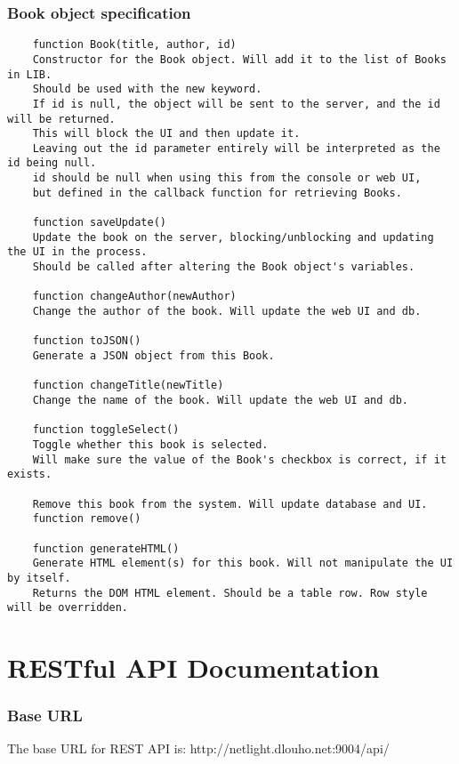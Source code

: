 \subsubsection{Book object specification}
\begin{verbatim}
    function Book(title, author, id)
    Constructor for the Book object. Will add it to the list of Books in LIB.
    Should be used with the new keyword.
    If id is null, the object will be sent to the server, and the id will be returned.
    This will block the UI and then update it.
    Leaving out the id parameter entirely will be interpreted as the id being null.
    id should be null when using this from the console or web UI,
    but defined in the callback function for retrieving Books.

    function saveUpdate()
    Update the book on the server, blocking/unblocking and updating the UI in the process.
    Should be called after altering the Book object's variables.

    function changeAuthor(newAuthor)
    Change the author of the book. Will update the web UI and db.

    function toJSON()
    Generate a JSON object from this Book.

    function changeTitle(newTitle)
    Change the name of the book. Will update the web UI and db.

    function toggleSelect()
    Toggle whether this book is selected.
    Will make sure the value of the Book's checkbox is correct, if it exists.

    Remove this book from the system. Will update database and UI.
    function remove()

    function generateHTML()
    Generate HTML element(s) for this book. Will not manipulate the UI by itself.
    Returns the DOM HTML element. Should be a table row. Row style will be overridden.
\end{verbatim}


\section{RESTful API Documentation}
\label{sec:restapi}

\subsubsection{Base URL}
The base URL for REST API is: http://netlight.dlouho.net:9004/api/

